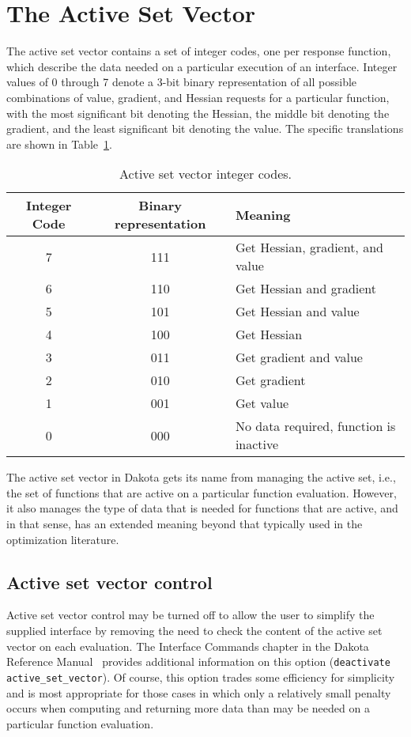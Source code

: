 \section{The Active Set Vector}\label{variables:asv}

The active set vector contains a set of integer codes, one per
response function, which describe the data needed on a particular
execution of an interface. Integer values of 0 through 7 denote a
3-bit binary representation of all possible combinations of value,
gradient, and Hessian requests for a particular function, with the
most significant bit denoting the Hessian, the middle bit denoting the
gradient, and the least significant bit denoting the value. The
specific translations are shown in Table~\ref{variables:table01}.

\begin{table}
  \centering
  \caption{Active set vector integer codes.}
  \label{variables:table01}\vspace{2mm}
  \begin{tabular}{|c|c|l|}
    \hline
    Integer Code & Binary representation & Meaning \\
    \hline
    7 & 111 & Get Hessian, gradient, and value \\
    6 & 110 & Get Hessian and gradient \\
    5 & 101 & Get Hessian and value \\
    4 & 100 & Get Hessian \\
    3 & 011 & Get gradient and value \\
    2 & 010 & Get gradient \\
    1 & 001 & Get value \\
    0 & 000 & No data required, function is inactive \\
    \hline
  \end{tabular}
\end{table}

The active set vector in Dakota gets its name from managing the active
set, i.e., the set of functions that are active on a particular
function evaluation. However, it also manages the type of data that is
needed for functions that are active, and in that sense, has an
extended meaning beyond that typically used in the optimization
literature.

\subsection{Active set vector control}\label{variables:asv:control}

Active set vector control may be turned off to allow the user to
simplify the supplied interface by removing the need to check the
content of the active set vector on each evaluation. The Interface
Commands chapter in the Dakota Reference Manual~\cite{RefMan} provides
additional information on this option (\texttt{deactivate
active\_set\_vector}).  Of course, this option trades some efficiency
for simplicity and is most appropriate for those cases in which only a
relatively small penalty occurs when computing and returning more data
than may be needed on a particular function evaluation.
